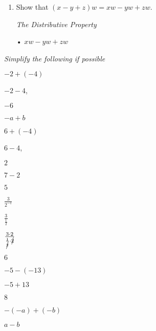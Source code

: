 \documentclass{article}
\begin{document}
\begin{enumerate}[start=21]
    \item Show that $(x - y + z)w = xw - yw + zw$.\par
    [\textit{Hint: $b + c + d = (b + c) + d$}]\par
    \begin{center}
        \textit{The Distributive Property}\par
        • $xw - yw + zw$
    \end{center}
\end{enumerate}


\textit{Simplify the following if possible}
\begin{enumerate}[start=28]
    \item $-2 + (-4)$\par
    \begin{center}
        \item $-2 - 4$,
        \item $-6$
    \end{center}

    \item $-a + b$
    
    \item $6 + (-4)$
    \begin{center}
        \item $6 - 4$,
        \item $2$
    \end{center}

    \item $7 - 2$
    \begin{center}
        \item $5$
    \end{center}

    \item $\frac{3}{2^{-1}}$
    \begin{center}
        \item $\frac{3}{\frac{1}{2}}$
        \item $\frac{3 \cdot 2}{\frac{1}{\cancel{2}} \cdot \cancel{2}}$
        \item $6$
    \end{center}

    \item $-5 - (-13)$
    \begin{center}
        \item $-5 + 13$
        \item $8$
    \end{center}

    \item $-(-a) + (-b)$
    \begin{center}
        \item $a - b$
    \end{center}


\end{enumerate}
\end{document}
